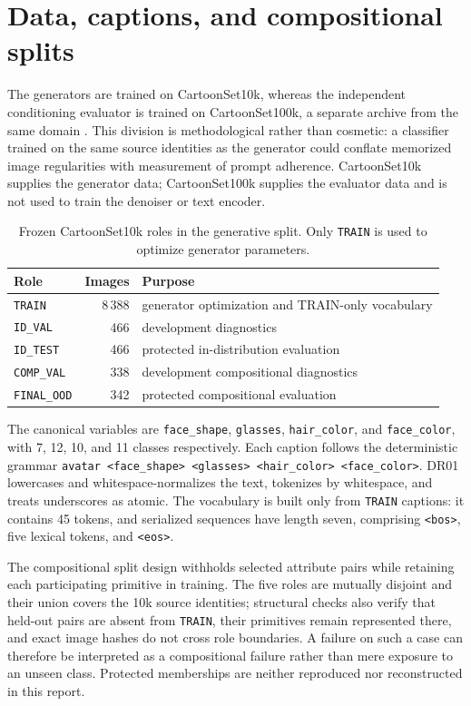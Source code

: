 \section{Data, captions, and compositional splits}\label{sec:data}
The generators are trained on CartoonSet10k, whereas the independent conditioning evaluator is trained on CartoonSet100k, a separate archive from the same domain \parencite{cartoonset}. This division is methodological rather than cosmetic: a classifier trained on the same source identities as the generator could conflate memorized image regularities with measurement of prompt adherence. CartoonSet10k supplies the generator data; CartoonSet100k supplies the evaluator data and is not used to train the denoiser or text encoder.

\begin{table}[htbp]
\centering
\caption{Frozen CartoonSet10k roles in the generative split. Only \texttt{TRAIN} is used to optimize generator parameters.}\label{tab:generative-splits}
\small
\begin{tabularx}{\linewidth}{l r Y}
\toprule
Role & Images & Purpose \\
\midrule
\texttt{TRAIN} & 8\,388 & generator optimization and TRAIN-only vocabulary \\
\texttt{ID\_VAL} & 466 & development diagnostics \\
\texttt{ID\_TEST} & 466 & protected in-distribution evaluation \\
\texttt{COMP\_VAL} & 338 & development compositional diagnostics \\
\texttt{FINAL\_OOD} & 342 & protected compositional evaluation \\
\bottomrule
\end{tabularx}
\end{table}

The canonical variables are \texttt{face\_shape}, \texttt{glasses}, \texttt{hair\_color}, and \texttt{face\_color}, with 7, 12, 10, and 11 classes respectively. Each caption follows the deterministic grammar \texttt{avatar <face\_shape> <glasses> <hair\_color> <face\_color>}. DR01 lowercases and whitespace-normalizes the text, tokenizes by whitespace, and treats underscores as atomic. The vocabulary is built only from \texttt{TRAIN} captions: it contains 45 tokens, and serialized sequences have length seven, comprising \texttt{<bos>}, five lexical tokens, and \texttt{<eos>}.

The compositional split design withholds selected attribute pairs while retaining each participating primitive in training. The five roles are mutually disjoint and their union covers the 10k source identities; structural checks also verify that held-out pairs are absent from \texttt{TRAIN}, their primitives remain represented there, and exact image hashes do not cross role boundaries. A failure on such a case can therefore be interpreted as a compositional failure rather than mere exposure to an unseen class. Protected memberships are neither reproduced nor reconstructed in this report.

